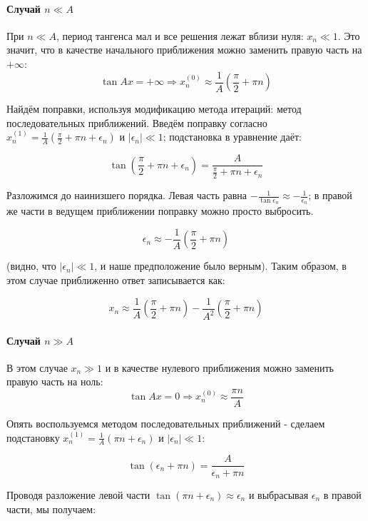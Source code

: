 \documentclass[a4paper,12pt]{article}
\begin{document}
\paragraph{Случай $n\ll A$}

При $n\ll A$, период тангенса мал и все решения лежат вблизи нуля:
$x_{n}\ll1$. Это значит, что в качестве начального приближения можно
заменить правую часть на $+\infty$:
\[
\tan Ax=+\infty\Rightarrow x_{n}^{(0)}\approx\frac{1}{A}\left(\frac{\pi}{2}+\pi n\right)
\]

\noindent
Найдём поправки, используя модификацию метода итераций: метод последовательных
приближений. Введём поправку согласно $x_{n}^{(1)}=\frac{1}{A}\left(\frac{\pi}{2}+\pi n+\epsilon_{n}\right)$
и $|\epsilon_{n}|\ll1$; подстановка в уравнение даёт:

\[
\tan\left(\frac{\pi}{2}+\pi n+\epsilon_{n}\right)=\frac{A}{\frac{\pi}{2}+\pi n+\epsilon_{n}}
\]

\noindent
Разложимся до наинизшего порядка. Левая часть равна $-\frac{1}{\tan\epsilon_{n}}\approx-\frac{1}{\epsilon_{n}}$;
в правой же части в ведущем приближении поправку можно просто выбросить.

\[
\epsilon_{n}\approx-\frac{1}{A}\left(\frac{\pi}{2}+\pi n\right)
\]

\noindent
(видно, что $|\epsilon_{n}|\ll1$, и наше предположение было верным).
Таким образом, в этом случае приближенно ответ записывается как:

\[
x_{n}\approx\frac{1}{A}\left(\frac{\pi}{2}+\pi n\right)-\frac{1}{A^{2}}\left(\frac{\pi}{2}+\pi n\right)
\]



\paragraph{Случай $n\gg A$}

В этом случае $x_{n}\gg1$ и в качестве нулевого приближения можно
заменить правую часть на ноль: 
\[
\tan Ax=0\Rightarrow x_{n}^{(0)}\approx\frac{\pi n}{A}
\]

\noindent
Опять воспользуемся методом последовательных приближений - сделаем
подстановку $x_{n}^{(1)}=\frac{1}{A}(\pi n+\epsilon_{n})$ и $|\epsilon_{n}|\ll1$:

\[
\tan\left(\epsilon_{n}+\pi n\right)=\frac{A}{\epsilon_{n}+\pi n}
\]

\noindent
Проводя разложение левой части $\tan(\pi n+\epsilon_{n})\approx\epsilon_{n}$
и выбрасывая $\epsilon_{n}$ в правой части, мы получаем:
\end{document}
